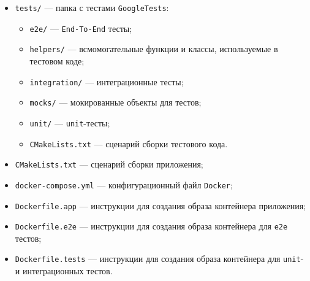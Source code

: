 \begin{itemize}[label=---]
\begin{itemize}[label=---]
\begin{itemize}[label=---]
            \item \texttt{MountError} --- класс исключения, связанного с операцией монтирования;
            \item \texttt{UnMountError} --- класс исключения, связанного с операцией размонтирования; 
            \item \texttt{HttpServer} --- класс запуска \texttt{HTTP} сервера;
            \item \texttt{IWebSocketServer} --- интерфейс класса работы с \texttt{WebSocket};
            \item \texttt{MountPointBuilder} --- класс создания пути монтирования;
            \item \texttt{WebSocketServer} --- класс работы с \texttt{WebSocket}.
        \end{itemize}
        \item \texttt{main.cpp} --- точка входа в программу.
    \end{itemize}
    \item \texttt{tests/} --- папка с тестами \texttt{GoogleTests}:
    \begin{itemize}[label=---]
        \item \texttt{e2e/} --- \texttt{End-To-End} тесты;
        \item \texttt{helpers/} --- всмомогательные функции и классы, используемые в тестовом коде;
        \item \texttt{integration/} --- интеграционные тесты;
        \item \texttt{mocks/} --- мокированные объекты для тестов;
        \item \texttt{unit/} --- \texttt{unit}-тесты;
        \item \texttt{CMakeLists.txt} --- сценарий сборки тестового кода.
    \end{itemize}
    \item \texttt{CMakeLists.txt} --- сценарий сборки приложения;
    \item \texttt{docker-compose.yml} --- конфигурационный файл \texttt{Docker};
    \item \texttt{Dockerfile.app} --- инструкции для создания образа контейнера приложения;
    \item \texttt{Dockerfile.e2e} --- инструкции для создания образа контейнера для \texttt{e2e} тестов;
    \item \texttt{Dockerfile.tests} --- инструкции для создания образа контейнера для \texttt{unit}- и интеграционных тестов.
\end{itemize}

